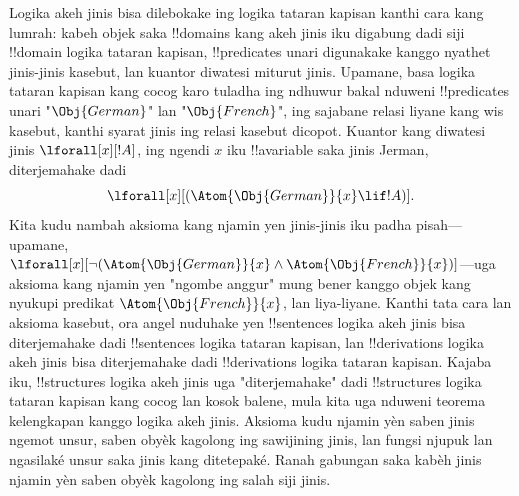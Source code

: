 \documentclass[../../../include/open-logic-section]{subfiles}
\begin{document}
Logika akeh jinis bisa dilebokake ing logika tataran
kapisan kanthi cara kang lumrah: kabeh
objek saka !!{domain}s kang akeh jinis iku
digabung dadi siji !!{domain} logika tataran kapisan,
!!{predicate}s unari digunakake kanggo
nyathet jinis-jinis kasebut, lan kuantor
diwatesi miturut jinis. Upamane, basa
logika tataran kapisan kang cocog karo tuladha
ing ndhuwur bakal nduweni !!{predicate}s
unari "$\Obj{German}$" lan "$\Obj{French}$",
ing sajabane relasi liyane kang wis kasebut,
kanthi syarat jinis ing relasi kasebut dicopot.
Kuantor kang diwatesi jinis
$\lforall[x][!A]$, ing ngendi $x$ iku
!!a{variable} saka jinis Jerman, diterjemahake dadi
\[
\lforall[x][(\Atom{\Obj{German}}{x} \lif !A)].
\]
Kita kudu nambah aksioma kang njamin
yen jinis-jinis iku padha pisah---upamane,
$\lforall[x][\lnot (\Atom{\Obj{German}}{x} \land
  \Atom{\Obj{French}}{x})]$---uga aksioma
kang njamin yen "ngombe anggur" mung bener
kanggo objek kang nyukupi predikat
$\Atom{\Obj{French}}{x}$, lan liya-liyane.
Kanthi tata cara lan aksioma kasebut,
ora angel nuduhake yen !!{sentence}s
logika akeh jinis bisa diterjemahake
dadi !!{sentence}s logika tataran kapisan,
lan !!{derivation}s logika akeh jinis
bisa diterjemahake dadi !!{derivation}s
logika tataran kapisan. Kajaba iku,
!!{structure}s logika akeh jinis uga
"diterjemahake" dadi !!{structure}s
logika tataran kapisan kang cocog lan
kosok balene, mula kita uga nduweni
teorema kelengkapan kanggo logika
akeh jinis. Aksioma kudu njamin yèn saben jinis ngemot unsur, saben obyèk kagolong ing sawijining jinis, lan fungsi njupuk lan ngasilaké unsur saka jinis kang ditetepaké. Ranah gabungan saka kabèh jinis njamin yèn saben obyèk kagolong ing salah siji jinis.
\end{document}
